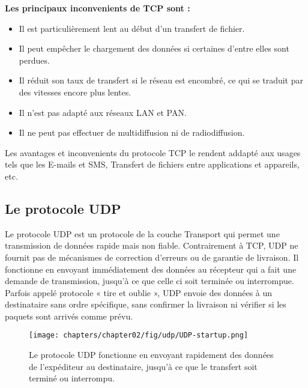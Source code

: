 \textbf{Les principaux inconvenients de TCP sont :}
\begin{itemize}
    \item Il est particulièrement lent au début d’un transfert de fichier.
    \item Il peut empêcher le chargement des données si certaines d’entre elles sont perdues. 
    \item Il réduit son taux de transfert si le réseau est encombré, ce qui se traduit par des vitesses encore plus lentes.
    \item Il n’est pas adapté aux réseaux LAN et PAN.
    \item Il ne peut pas effectuer de multidiffusion ni de radiodiffusion.
\end{itemize}

Les avantages et inconvenients du protocole TCP le rendent addapté aux usages tels que les E-mails et SMS, Transfert de fichiers entre applications et appareils, etc.

\subsection{Le protocole UDP}
Le protocole UDP est un protocole de la couche Transport qui permet une transmission de données rapide mais non fiable. Contrairement à TCP, UDP ne fournit pas de mécanismes de correction d'erreurs ou de garantie de livraison. Il fonctionne en envoyant immédiatement des données au récepteur qui a fait une demande de transmission, jusqu’à ce que celle ci soit terminée ou interrompue. Parfois appelé protocole « tire et oublie », UDP envoie des données à un destinataire sans ordre spécifique, sans confirmer la livraison ni vérifier si les paquets sont arrivés comme prévu\cite{gorman-2023}.

\begin{figure}[H]
    \centering
    \texttt{[image: chapters/chapter02/fig/udp/UDP-startup.png]}
    \caption{Le protocole UDP fonctionne en envoyant rapidement des données de l’expéditeur au destinataire, jusqu’à ce que le transfert soit terminé ou interrompu.\cite{gorman-2023}}
    \label{fig:gen}
\end{figure}

